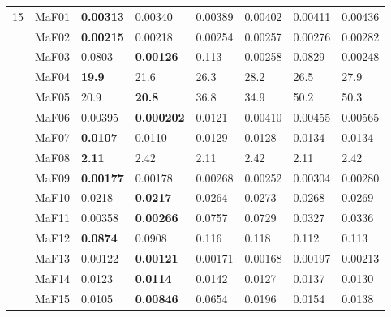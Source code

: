 \documentclass[]{article}
\begin{document}
\begin{landscape}
\begin{table}
\begin{footnotesize}
\begin{tabular}{|l|l|l|l|l|l|l|l|}
\multirow{15}{*}{15} & MaF01 & \cellcolor{gray95} {\bf 0.00313} & \cellcolor{gray95} 0.00340 & 0.00389 & 0.00402 & 0.00411 & 0.00436\\
 & MaF02 & \cellcolor{gray95} {\bf 0.00215} & \cellcolor{gray95} 0.00218 & 0.00254 & 0.00257 & 0.00276 & 0.00282\\
 & MaF03 & 0.0803 & \cellcolor{gray95} {\bf 0.00126} & 0.113 & 0.00258 & 0.0829 & 0.00248\\
 & MaF04 & \cellcolor{gray95} {\bf 19.9} & \cellcolor{gray95} 21.6 & 26.3 & 28.2 & 26.5 & 27.9\\
 & MaF05 & \cellcolor{gray95} 20.9 & \cellcolor{gray95} {\bf 20.8} & 36.8 & 34.9 & 50.2 & 50.3\\
 & MaF06 & 0.00395 & \cellcolor{gray95} {\bf 0.000202} & 0.0121 & 0.00410 & 0.00455 & 0.00565\\
 & MaF07 & \cellcolor{gray95} {\bf 0.0107} & \cellcolor{gray95} 0.0110 & 0.0129 & 0.0128 & 0.0134 & 0.0134\\
 & MaF08 & \cellcolor{gray95} {\bf 2.11} & \cellcolor{gray95} 2.42 & \cellcolor{gray95} 2.11 & \cellcolor{gray95} 2.42 & 2.11 & 2.42\\
 & MaF09 & \cellcolor{gray95} {\bf 0.00177} & \cellcolor{gray95} 0.00178 & 0.00268 & 0.00252 & 0.00304 & 0.00280\\
 & MaF10 & \cellcolor{gray95} 0.0218 & \cellcolor{gray95} {\bf 0.0217} & 0.0264 & 0.0273 & 0.0268 & 0.0269\\
 & MaF11 & \cellcolor{gray95} 0.00358 & \cellcolor{gray95} {\bf 0.00266} & 0.0757 & 0.0729 & 0.0327 & 0.0336\\
 & MaF12 & \cellcolor{gray95} {\bf 0.0874} & \cellcolor{gray95} 0.0908 & 0.116 & 0.118 & 0.112 & 0.113\\
 & MaF13 & \cellcolor{gray95} 0.00122 & \cellcolor{gray95} {\bf 0.00121} & 0.00171 & 0.00168 & 0.00197 & 0.00213\\
 & MaF14 & \cellcolor{gray95} 0.0123 & \cellcolor{gray95} {\bf 0.0114} & 0.0142 & 0.0127 & 0.0137 & 0.0130\\
 & MaF15 & \cellcolor{gray95} 0.0105 & \cellcolor{gray95} {\bf 0.00846} & 0.0654 & 0.0196 & 0.0154 & 0.0138\\
\hline
\end{tabular}
\end{footnotesize}
\end{table}
\end{landscape}
\end{document}
